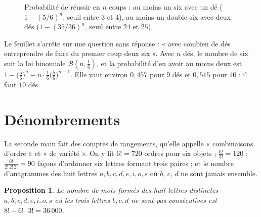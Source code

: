 \documentclass[11pt,a4paper]{article}
\theoremstyle{plain}
\newtheorem{proposition}[theoreme]{Proposition}
\theoremstyle{definition}
\theoremstyle{remark}
\begin{document}
\begin{figure}[h]
\centering
{}
\caption{Probabilité de réussir en $n$ coups : au moins un six avec un dé ($1-(5/6)^n$, seuil entre $3$ et $4$), au moins un double six avec deux dés ($1-(35/36)^n$, seuil entre $24$ et $25$).}\label{fig:mere}
\end{figure}

Le feuillet s'arrête sur une question sans réponse : « avec combien de dés entreprendre de faire du premier coup deux six ». Avec $n$ dés, le nombre de six suit la loi binomiale $\mathcal B(n,\frac16)$, et la probabilité d'en avoir au moins deux est $1-\big(\frac56\big)^n-n\cdot\frac16\big(\frac56\big)^{n-1}$. Elle vaut environ $0{,}457$ pour $9$ dés et $0{,}515$ pour $10$ : il faut $10$ dés.

\section{Dénombrements}

La seconde main fait des comptes de rangements, qu'elle appelle « combinaisons d'ordre » et « de variété ». On y lit $6!=720$ ordres pour six objets ; $\frac{6!}{3!}=120$ ; $\frac{6!}{2!\,2!\,2!}=90$ façons d'ordonner six lettres formant trois paires ; et le nombre d'anagrammes des huit lettres $a,b,c,d,e,i,o,s$ où $b$, $c$, $d$ ne sont jamais ensemble.

\begin{proposition}
Le nombre de mots formés des huit lettres distinctes $a,b,c,d,e,i,o,s$ où les trois lettres $b,c,d$ ne sont pas consécutives est $8!-6!\cdot3!=36\,000$.
\end{proposition}
\end{document}
